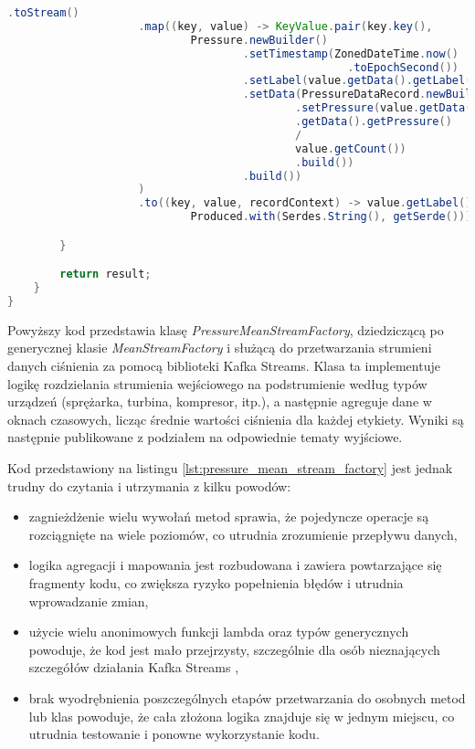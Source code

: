 \begin{lstlisting}[caption=Poprzednia implementacja przetwarzająca strumienie danych, label={lst:pressure_mean_stream_factory},language=Java]
                    .toStream()
                    .map((key, value) -> KeyValue.pair(key.key(),
                            Pressure.newBuilder()
                                    .setTimestamp(ZonedDateTime.now()
                                                    .toEpochSecond())
                                    .setLabel(value.getData().getLabel())
                                    .setData(PressureDataRecord.newBuilder()
                                            .setPressure(value.getData()
                                            .getData().getPressure() 
                                            / 
                                            value.getCount())
                                            .build())
                                    .build())
                    )
                    .to((key, value, recordContext) -> value.getLabel().toString() + getOutputTopicsPostfix(),
                            Produced.with(Serdes.String(), getSerde()));

        }

        return result;
    }
}  

\end{lstlisting}

Powyższy kod przedstawia klasę \textit{PressureMeanStreamFactory}, dziedziczącą po generycznej klasie \textit{MeanStreamFactory} i służącą do przetwarzania strumieni danych ciśnienia za pomocą biblioteki Kafka Streams. Klasa ta implementuje logikę rozdzielania strumienia wejściowego na podstrumienie według typów urządzeń (sprężarka, turbina, kompresor, itp.), a następnie agreguje dane w oknach czasowych, licząc średnie wartości ciśnienia dla każdej etykiety. Wyniki są następnie publikowane z podziałem na odpowiednie tematy wyjściowe.

\vspace{0.3em}

Kod przedstawiony na listingu \ref{lst:pressure_mean_stream_factory} jest jednak trudny do czytania i utrzymania z kilku powodów:
\begin{itemize}
    \item zagnieżdżenie wielu wywołań metod sprawia, że pojedyncze operacje są rozciągnięte na wiele poziomów, co utrudnia zrozumienie przepływu danych,
    \item logika agregacji i mapowania jest rozbudowana i zawiera powtarzające się fragmenty kodu, co zwiększa ryzyko popełnienia błędów i utrudnia wprowadzanie zmian,
    \item użycie wielu anonimowych funkcji lambda oraz typów generycznych powoduje, że kod jest mało przejrzysty, szczególnie dla osób nieznających szczegółów działania Kafka Streams \cite{kafka_streams},
    \item brak wyodrębnienia poszczególnych etapów przetwarzania do osobnych metod lub klas powoduje, że cała złożona logika znajduje się w jednym miejscu, co utrudnia testowanie i ponowne wykorzystanie kodu.
\end{itemize}

